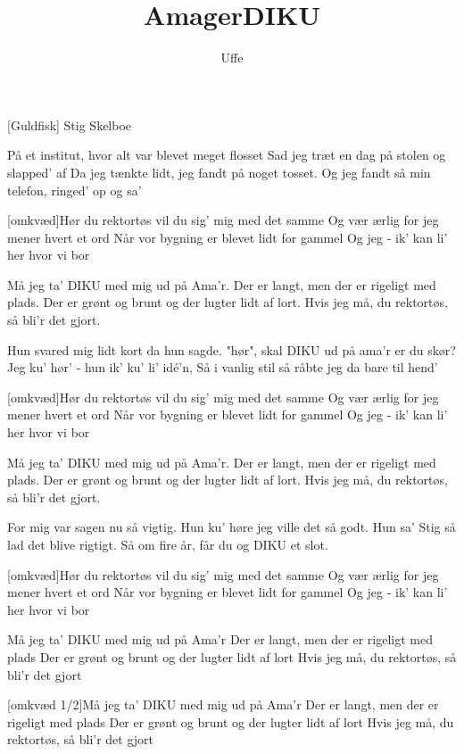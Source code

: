 \documentclass[a4paper,11pt]{article}
\title{AmagerDIKU}
\author{Uffe}
\begin{document}
\maketitle

\begin{roles}
[Guldfisk] Stig Skelboe
\end{roles}

\begin{props}
\prop{}
\end{props}

  
\begin{song}

På et institut, hvor alt var blevet meget flosset
Sad jeg træt en dag på stolen og slapped' af
Da jeg tænkte lidt, jeg fandt på noget tosset.
Og jeg fandt så min telefon, ringed' op og sa'

[omkvæd]Hør du rektortøs vil du sig' mig med det samme
Og vær ærlig for jeg mener hvert et ord
Når vor bygning er blevet lidt for gammel
Og jeg - ik' kan li' her hvor vi bor

Må jeg ta' DIKU med mig ud på Ama'r.
Der er langt, men der er rigeligt med plads.
Der er grønt og brunt og der lugter lidt af lort.
Hvis jeg må, du rektortøs, så bli'r det gjort.


Hun svared mig lidt kort da hun sagde. "hør",
skal DIKU ud på ama'r er du skør?
Jeg ku' hør' - hun ik' ku' li' idé'n,
Så i vanlig stil så råbte jeg da bare til hend'

[omkvæd]Hør du rektortøs vil du sig' mig med det samme
Og vær ærlig for jeg mener hvert et ord
Når vor bygning er blevet lidt for gammel
Og jeg - ik' kan li' her hvor vi bor

Må jeg ta' DIKU med mig ud på Ama'r.
Der er langt, men der er rigeligt med plads.
Der er grønt og brunt og der lugter lidt af lort.
Hvis jeg må, du rektortøs, så bli'r det gjort.


For mig var sagen nu så vigtig.
Hun ku' høre jeg ville det så godt.
Hun sa' Stig så lad det blive rigtigt.
Så om fire år, får du og DIKU et slot.

[omkvæd]Hør du rektortøs vil du sig' mig med det samme
Og vær ærlig for jeg mener hvert et ord
Når vor bygning er blevet lidt for gammel
Og jeg - ik' kan li' her hvor vi bor

Må jeg ta' DIKU med mig ud på Ama'r 
Der er langt, men der er rigeligt med plads
Der er grønt og brunt og der lugter lidt af lort
Hvis jeg må, du rektortøs, så bli'r det gjort

[omkvæd 1/2]Må jeg ta' DIKU med mig ud på Ama'r 
Der er langt, men der er rigeligt med plads
Der er grønt og brunt og der lugter lidt af lort
Hvis jeg må, du rektortøs, så bli'r det gjort


\end{song}
\end{document}
